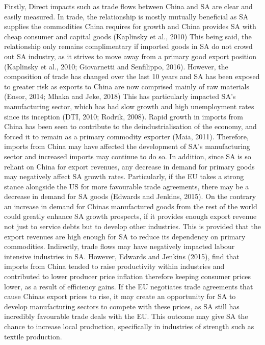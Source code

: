 \documentclass[11pt,preprint, authoryear]{elsarticle}
\numberwithin{equation}{section}
\numberwithin{figure}{section}
\numberwithin{table}{section}
\begin{document}
Firstly, Direct impacts such as trade flows between China and SA are
clear and easily measured. In trade, the relationship is mostly mutually
beneficial as SA supplies the commodities China requires for growth and
China provides SA with cheap consumer and capital goods (Kaplinsky et
al., 2010) This being said, the relationship only remains complimentary
if imported goods in SA do not crowd out SA industry, as it strives to
move away from a primary good export position (Kaplinsky et al., 2010;
Giovarnetti and Senfilippo, 2016). However, the composition of trade has
changed over the last 10 years and SA has been exposed to greater risk
as exports to China are now comprised mainly of raw materials (Ensor,
2014; Mhaka and Jeke, 2018) This has particularly impacted SA's
manufacturing sector, which has had slow growth and high unemployment
rates since its inception (DTI, 2010; Rodrik, 2008). Rapid growth in
imports from China has been seen to contribute to the
deindustrialisation of the economy, and forced it to remain as a primary
commodity exporter (Maia, 2011). Therefore, imports from China may have
affected the development of SA's manufacturing sector and increased
imports may continue to do so. In addition, since SA is so reliant on
China for export revenues, any decrease in demand for primary goods may
negatively affect SA growth rates. Particularly, if the EU takes a
strong stance alongside the US for more favourable trade agreements,
there may be a decrease in demand for SA goods (Edwards and Jenkins,
2015). On the contrary an increase in demand for Chinas manufactured
goods from the rest of the world could greatly enhance SA growth
prospects, if it provides enough export revenue not just to service
debts but to develop other industries. This is provided that the export
revenues are high enough for SA to reduce its dependency on primary
commodities. Indirectly, trade flows may have negatively impacted labour
intensive industries in SA. However, Edwards and Jenkins (2015), find
that imports from China tended to raise productivity within industries
and contributed to lower producer price inflation therefore keeping
consumer prices lower, as a result of efficiency gains. If the EU
negotiates trade agreements that cause Chinas export prices to rise, it
may create an opportunity for SA to develop manufacturing sectors to
compete with these prices, as SA still has incredibly favourable trade
deals with the EU. This outcome may give SA the chance to increase local
production, specifically in industries of strength such as textile
production.
\end{document}
